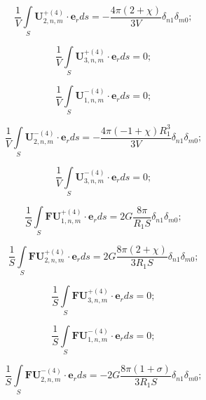 \begin{russian}
\begin{equation}
\frac{1}{V}\int\limits_S \mathbf{U}_{2,n,m}^{+(4)}\cdot\mathbf{e}_r ds=-\frac{4\pi(2+\chi)}{3V}\delta_{n1}\delta_{m0};
\label{eq:12:16}
\end{equation}

\begin{equation}
\frac{1}{V}\int\limits_S \mathbf{U}_{3,n,m}^{+(4)}\cdot\mathbf{e}_r ds=0;
\label{eq:12:17}
\end{equation}

\begin{equation}
\frac{1}{V}\int\limits_S \mathbf{U}_{1,n,m}^{-(4)}\cdot\mathbf{e}_r ds=0;
\label{eq:12:18}
\end{equation}

\begin{equation}
\frac{1}{V}\int\limits_S \mathbf{U}_{2,n,m}^{-(4)}\cdot\mathbf{e}_r ds=-\frac{4\pi(-1+\chi)R_1^3}{3V}\delta_{n1}\delta_{m0};
\label{eq:12:19}
\end{equation}

\begin{equation}
\frac{1}{V}\int\limits_S \mathbf{U}_{3,n,m}^{-(4)}\cdot\mathbf{e}_r ds=0;
\label{eq:12:20}
\end{equation}

\begin{equation}
\frac{1}{S}\int\limits_S \mathbf{FU}_{1,n,m}^{+(4)}\cdot\mathbf{e}_r ds=2G\frac{8\pi}{R_1 S}\delta_{n1}\delta_{m0};
\label{eq:12:21}
\end{equation}

\begin{equation}
\frac{1}{S}\int\limits_S \mathbf{FU}_{2,n,m}^{+(4)}\cdot\mathbf{e}_r ds=2G\frac{8\pi(2+\chi)}{3R_1 S}\delta_{n1}\delta_{m0};
\label{eq:12:22}
\end{equation}

\begin{equation}
\frac{1}{S}\int\limits_S \mathbf{FU}_{3,n,m}^{+(4)}\cdot\mathbf{e}_r ds=0;
\label{eq:12:23}
\end{equation}

\begin{equation}
\frac{1}{S}\int\limits_S \mathbf{FU}_{1,n,m}^{-(4)}\cdot\mathbf{e}_r ds=0;
\label{eq:12:24}
\end{equation}

\begin{equation}
\frac{1}{S}\int\limits_S \mathbf{FU}_{2,n,m}^{-(4)}\cdot\mathbf{e}_r ds=-2G\frac{8\pi(1+\sigma)}{3R_1 S}\delta_{n1}\delta_{m0};
\label{eq:12:25}
\end{equation}


\end{russian}
